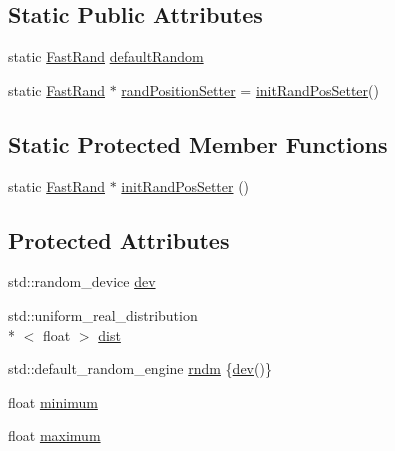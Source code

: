 \subsection*{Static Public Attributes}
\begin{DoxyCompactItemize}
\item 
static \hyperlink{class_fast_rand}{Fast\-Rand} \hyperlink{class_fast_rand_3_01float_01_4_a8541f7765fbcf42c951134c4a3980ab5}{default\-Random}
\item 
static \hyperlink{class_fast_rand}{Fast\-Rand} $\ast$ \hyperlink{class_fast_rand_3_01float_01_4_a21d8919b2edde92a6f5f52d4941b47de}{rand\-Position\-Setter} = \hyperlink{class_fast_rand_3_01float_01_4_ac193153b8f0ce337a272f3c8274dba64}{init\-Rand\-Pos\-Setter}()
\end{DoxyCompactItemize}
\subsection*{Static Protected Member Functions}
\begin{DoxyCompactItemize}
\item 
static \hyperlink{class_fast_rand}{Fast\-Rand} $\ast$ \hyperlink{class_fast_rand_3_01float_01_4_ac193153b8f0ce337a272f3c8274dba64}{init\-Rand\-Pos\-Setter} ()
\end{DoxyCompactItemize}
\subsection*{Protected Attributes}
\begin{DoxyCompactItemize}
\item 
std\-::random\-\_\-device \hyperlink{class_fast_rand_3_01float_01_4_a6df58e798e46b7e8a12abb8a2108a0d4}{dev}
\item 
std\-::uniform\-\_\-real\-\_\-distribution\\*
$<$ float $>$ \hyperlink{class_fast_rand_3_01float_01_4_a55e3657b55f664dbe6139846a18b6d5b}{dist}
\item 
std\-::default\-\_\-random\-\_\-engine \hyperlink{class_fast_rand_3_01float_01_4_a4e627b7fa54bb1f71462ff0ba3a0a95c}{rndm} \{\hyperlink{class_fast_rand_3_01float_01_4_a6df58e798e46b7e8a12abb8a2108a0d4}{dev}()\}
\item 
float \hyperlink{class_fast_rand_3_01float_01_4_aa7c4d17d121e31bbc2b815f1f9a5b204}{minimum}
\item 
float \hyperlink{class_fast_rand_3_01float_01_4_a3d2416ee22bca8371f35b24a16c65165}{maximum}
\end{DoxyCompactItemize}


